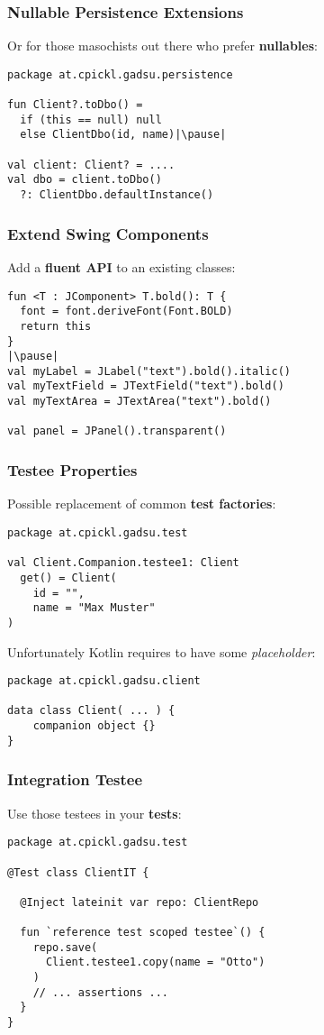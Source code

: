 \begin{frame}[fragile] \frametitle{Nullable Persistence Extensions}
Or for those masochists out there who prefer \textbf{nullables}:
\begin{lstlisting}
package at.cpickl.gadsu.persistence

fun Client?.toDbo() = 
  if (this == null) null 
  else ClientDbo(id, name)|\pause|

val client: Client? = ....
val dbo = client.toDbo()
  ?: ClientDbo.defaultInstance()
\end{lstlisting}
\end{frame}



\begin{frame}[fragile] \frametitle{Extend Swing Components}
Add a \textbf{fluent API} to an existing classes:
\begin{lstlisting}
fun <T : JComponent> T.bold(): T {
  font = font.deriveFont(Font.BOLD)
  return this
}
|\pause|
val myLabel = JLabel("text").bold().italic()
val myTextField = JTextField("text").bold()
val myTextArea = JTextArea("text").bold()

val panel = JPanel().transparent()
\end{lstlisting}
\end{frame}



\begin{frame}[fragile] \frametitle{Testee Properties}
Possible replacement of common \textbf{test factories}:
\begin{lstlisting}
package at.cpickl.gadsu.test

val Client.Companion.testee1: Client
  get() = Client(
    id = "",
    name = "Max Muster"
)
\end{lstlisting}
\pause

Unfortunately Kotlin requires to have some \textit{placeholder}:
\begin{lstlisting}
package at.cpickl.gadsu.client

data class Client( ... ) {
    companion object {}
}
\end{lstlisting}
\end{frame}

\begin{frame}[fragile] \frametitle{Integration Testee}
Use those testees in your \textbf{tests}:
\begin{lstlisting}
package at.cpickl.gadsu.test

@Test class ClientIT {

  @Inject lateinit var repo: ClientRepo
  
  fun `reference test scoped testee`() {
    repo.save(
      Client.testee1.copy(name = "Otto")
    )
    // ... assertions ... 
  }
}
\end{lstlisting}
\end{frame}

